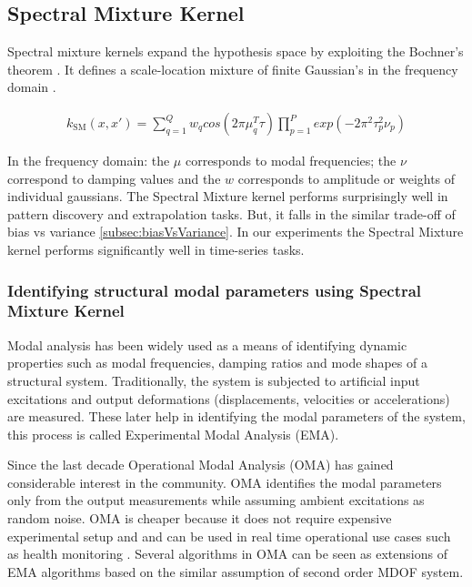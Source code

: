 \subsection{Spectral Mixture Kernel}
Spectral mixture kernels expand the hypothesis space by exploiting the Bochner's theorem \cite{bochner1959lectures}. It defines a scale-location mixture of finite Gaussian's in the frequency domain \cite{wilson2013gaussian}. 

\begin{align}
k_{\textrm{SM}}(x, x') = \sum_{q=1}^{Q}w_{q}cos(2\pi\mu_{q}^{T}\tau)\prod_{p=1}^{P}exp(-2\pi^{2}\tau_{p}^{2}\nu_{p})
\end{align}

In the frequency domain: the $\mu$ corresponds to modal frequencies; the $\nu$ correspond to damping values and the $w$ corresponds to amplitude or weights of individual gaussians. The Spectral Mixture kernel performs surprisingly well in pattern discovery and extrapolation tasks. But, it falls in the similar trade-off of bias vs variance \ref{subsec:biasVsVariance}. In our experiments the Spectral Mixture kernel performs significantly well in time-series tasks.

\subsubsection{Identifying structural modal parameters using Spectral Mixture Kernel}
Modal analysis has been widely used as a means of identifying dynamic properties such as modal frequencies, damping ratios and mode shapes of a structural system. Traditionally, the system is subjected to artificial input excitations and output deformations (displacements, velocities or accelerations) are measured. These later help in identifying the modal parameters of the system, this process is called Experimental Modal Analysis (EMA). 

Since the last decade Operational Modal Analysis (OMA) has gained considerable interest in the community. OMA identifies the modal parameters only from the output measurements while assuming ambient excitations as random noise. OMA is cheaper because it does not require expensive experimental setup and and can be used in real time operational use cases such as health monitoring \cite{peeters2005industrial} \cite{shahdin2010correlating} \cite{rainieri2007automated}. Several algorithms in OMA can be seen as extensions of EMA algorithms based on the similar assumption of second order MDOF system.

